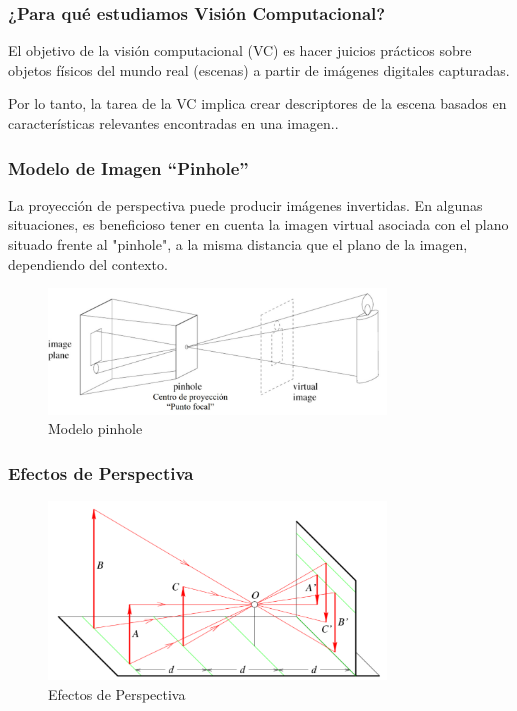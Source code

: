 \subsubsection{¿Para qué estudiamos Visión Computacional?}
	
El objetivo de la visión computacional (VC) es hacer juicios prácticos sobre objetos físicos del mundo real (escenas) a partir de imágenes digitales capturadas.

Por lo tanto, la tarea de la VC implica crear descriptores de la escena basados en características relevantes encontradas en una imagen..
	
	
\subsubsection{Modelo de Imagen “Pinhole”}
	
La proyección de perspectiva puede producir imágenes invertidas. En algunas situaciones, es beneficioso tener en cuenta la imagen virtual asociada con el plano situado frente al "pinhole", a la misma distancia que el plano de la imagen, dependiendo del contexto.

	
\begin{figure}[H]
	\begin{center}
		\includegraphics[width=0.8\textwidth]{2/figures/vc2.jpeg}
		\caption{Modelo pinhole}
		\label{}
	\end{center}
	
\end{figure}


\subsubsection{Efectos de Perspectiva}




\begin{figure}[H]
	\begin{center}
		\includegraphics[width=0.8\textwidth]{2/figures/vc3.png}
		\caption{Efectos de Perspectiva}
		\label{}
	\end{center}
	
\end{figure}

